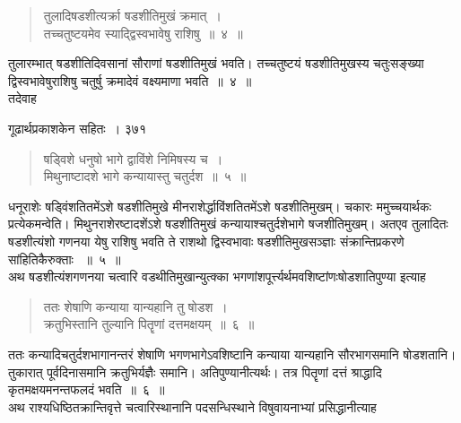 \documentclass[11pt, openany]{book}
\begin{document}

\begin{quote}
{\ssi तुलादिषडशीत्यर्क्रा षडशीतिमुखं क्रमात्~।\\
तच्चतुष्टयमेव स्याद्द्विस्वभावेषु राशिषु~॥~४~॥}
\end{quote}
 तुलारम्भात् षडशीतिदिवसानां सौराणां षडशीतिमुखं भवति। तच्चतुष्टयं षडशीतिमुखस्य चतुःसङ्ख्या द्विस्वभावेषुराशिषु चतुर्षु क्रमादेवं वक्ष्यमाणा भवति~॥~४~॥ \\
तदेवाह \textendash



\newpage


\hspace{3cm} गूढार्थप्रकाशकेन सहितः~। \hfill ३७१
\vspace{1cm}


 \begin{quote}
 {\ssi षड्विशे धनुषो भागे द्वाविंशे निमिषस्य च~।\\
मिथुनाष्टादशे भागे कन्यायास्तु चतुर्दश~॥~५~॥}
\end{quote}

 धनूराशेः षड्विंशतितमेंऽशे षडशीतिमुखे मीनराशेर्द्धाविंशतितमेंऽशे षडशीतिमुखम्। चकारः ममुच्चयार्थकः प्रत्येकमन्वेति। मिथुनराशेरष्टादशेंऽशे षडशीतिमुखं कन्यायाश्चतुर्दशेभागे षजशीतिमुखम्। अतएव तुलादितः षडशीत्यंशो गणनया येषु राशिषु भवति ते राशथो द्विस्वभावाः षडशीतिमुखसञ्ज्ञाः संक्रान्तिप्रकरणे सांहितिकैरुक्ताः ~॥~५~॥ \\
\noindent अथ षडशीत्यंशगणनया चत्वारि वडथीतिमुखान्युत्क्का भगणांशपूर्त्त्यर्थमवशिष्टांणःषोडशातिपुण्या इत्याह \textendash


\begin{quote}
{\ssi ततः शेषाणि कन्याया यान्यहानि तु षोडश~। \\
क्रतुभिस्तानि तुल्यानि पितॄणां दत्तमक्षयम्~॥~६~॥ }
\end{quote}
 ततः कन्यादिचतुर्दशभागानन्तरं शेषाणि भगणभागेऽवशिष्टानि कन्याया यान्यहानि सौरभागसमानि षोडशतानि। तुकारात् पूर्वदिनासमानि क्रतुभिर्यज्ञैः समानि। अतिपुण्यानीत्यर्थः। तत्र पितॄणां दत्तं श्राद्धादि कृतमक्षयमनन्तफलदं भवति~॥~६~॥ \\
\noindent अथ राश्यधिष्ठितक्रान्तिवृत्ते चत्वारिस्थानानि पदसन्धिस्थाने विषुवायनाभ्यां प्रसिद्धानीत्याह \textendash

\end{document}
